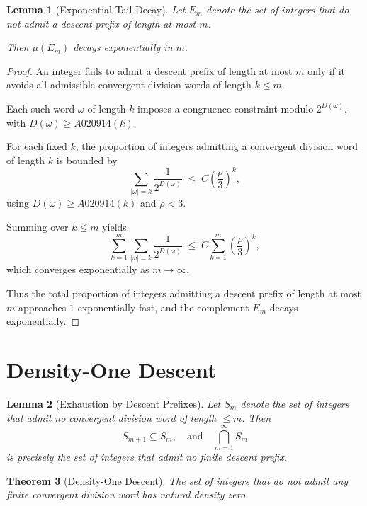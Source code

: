 \documentclass[12pt, oneside]{article}
\numberwithin{equation}{section}
\theoremstyle{definition}
\theoremstyle{plain}
\newtheorem{theorem}{Theorem}[section]
\newtheorem{lemma}[theorem]{Lemma}
\theoremstyle{remark}
\begin{document}
\begin{lemma}[Exponential Tail Decay]
Let $E_m$ denote the set of integers that do not admit a descent prefix
of length at most $m$.

Then $\mu(E_m)$ decays exponentially in $m$.
\end{lemma}

\begin{proof}
An integer fails to admit a descent prefix of length at most $m$ only if it avoids
all admissible convergent division words of length $k \le m$.

Each such word $\omega$ of length $k$ imposes a congruence constraint modulo
$2^{D(\omega)}$, with $D(\omega) \ge A020914(k)$.

For each fixed $k$, the proportion of integers admitting a convergent division
word of length $k$ is bounded by
\[
\sum_{|\omega|=k} \frac{1}{2^{D(\omega)}}
\;\le\;
C\left(\frac{\rho}{3}\right)^k,
\]
using $D(\omega) \ge A020914(k)$ and $\rho < 3$.

Summing over $k \le m$ yields
\[
\sum_{k=1}^{m} \sum_{|\omega|=k} \frac{1}{2^{D(\omega)}}
\;\le\;
C \sum_{k=1}^{m} \left(\frac{\rho}{3}\right)^k,
\]
which converges exponentially as $m \to \infty$.

Thus the total proportion of integers admitting a descent prefix of length at most $m$
approaches $1$ exponentially fast, and the complement $E_m$ decays exponentially.
\end{proof}

\section{Density-One Descent}
\label{sec:density-one-descent}

\begin{lemma}[Exhaustion by Descent Prefixes]
Let $S_m$ denote the set of integers that admit no convergent division word
of length $\le m$. Then
\[
S_{m+1} \subseteq S_m,
\quad\text{and}\quad
\bigcap_{m=1}^\infty S_m
\]
is precisely the set of integers that admit no finite descent prefix.
\end{lemma}

\begin{theorem}[Density-One Descent]
The set of integers that do not admit any finite convergent division word
has natural density zero.
\end{theorem}
\end{document}
